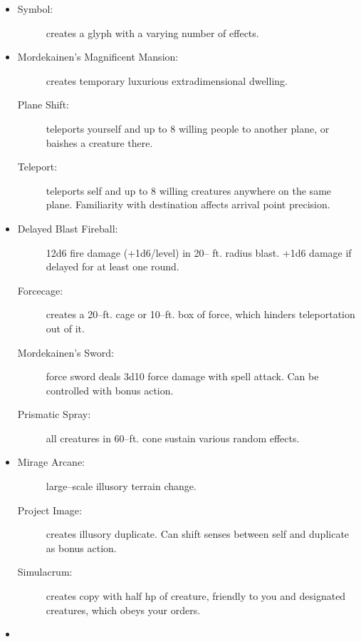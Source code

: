 \documentclass[DIV=14, paper=a4, fontsize=12pt, twocolumn, twoside]{scrartcl}
\begin{document}
\begin{itemize}[align=parleft,labelwidth=1cm]
	\renewcommand{\labelitemi}{Abjur}\item
	\begin{description}
 \item[Symbol:] creates a glyph with a varying number of effects.
\end{description}
\renewcommand{\labelitemi}{Conj}\item
\begin{description}
 \item[Mordekainen’s Magnificent Mansion:] creates temporary luxurious extradimensional dwelling.
 \item[Plane Shift:] teleports yourself and up to 8 willing people to another plane, or baishes a creature there.
 \item[Teleport:] teleports self and up to 8 willing creatures anywhere on the same plane. Familiarity with destination affects arrival point precision.
\end{description}
\renewcommand{\labelitemi}{Evoc}\item
\begin{description}
 \item[Delayed Blast Fireball:] 12d6 fire damage (+1d6/level) in 20– ft. radius blast. +1d6 damage if delayed for at least one round.
 \item[Forcecage:] creates a 20–ft. cage or 10–ft. box of force, which hinders teleportation out of it.
 \item[Mordekainen’s Sword:] force sword deals 3d10 force damage with spell attack. Can be controlled with bonus action.
 \item[Prismatic Spray:] all creatures in 60–ft. cone sustain various random effects.
\end{description}
\renewcommand{\labelitemi}{Illus}\item
\begin{description}
 \item[Mirage Arcane:] large–scale illusory terrain change.
 \item[Project Image:] creates illusory duplicate. Can shift senses between self and duplicate as bonus action.
 \item[Simulacrum:] creates copy with half hp of creature, friendly to you and designated creatures, which obeys your orders.
\end{description}
\renewcommand{\labelitemi}{Necro}\item
\begin{description}

\end{description}
\end{itemize}
\end{document}
